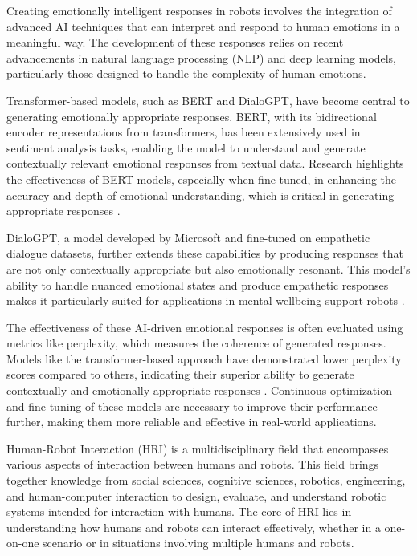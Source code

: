 Creating emotionally intelligent responses in robots involves the integration of advanced AI techniques that can interpret and respond to human emotions in a meaningful way. The development of these responses relies on recent advancements in natural language processing (NLP) and deep learning models, particularly those designed to handle the complexity of human emotions.

Transformer-based models, such as BERT and DialoGPT, have become central to generating emotionally appropriate responses. BERT, with its bidirectional encoder representations from transformers, has been extensively used in sentiment analysis tasks, enabling the model to understand and generate contextually relevant emotional responses from textual data. Research highlights the effectiveness of BERT models, especially when fine-tuned, in enhancing the accuracy and depth of emotional understanding, which is critical in generating appropriate responses \cite{wu2024}. 

DialoGPT, a model developed by Microsoft and fine-tuned on empathetic dialogue datasets, further extends these capabilities by producing responses that are not only contextually appropriate but also emotionally resonant. This model’s ability to handle nuanced emotional states and produce empathetic responses makes it particularly suited for applications in mental wellbeing support robots \cite{abuhmida2024}.

The effectiveness of these AI-driven emotional responses is often evaluated using metrics like perplexity, which measures the coherence of generated responses. Models like the transformer-based approach have demonstrated lower perplexity scores compared to others, indicating their superior ability to generate contextually and emotionally appropriate responses \cite{abuhmida2024}. Continuous optimization and fine-tuning of these models are necessary to improve their performance further, making them more reliable and effective in real-world applications.

Human-Robot Interaction (HRI) is a multidisciplinary field that encompasses various aspects of interaction between humans and robots. This field brings together knowledge from social sciences, cognitive sciences, robotics, engineering, and human-computer interaction to design, evaluate, and understand robotic systems intended for interaction with humans. The core of HRI lies in understanding how humans and robots can interact effectively, whether in a one-on-one scenario or in situations involving multiple humans and robots.

